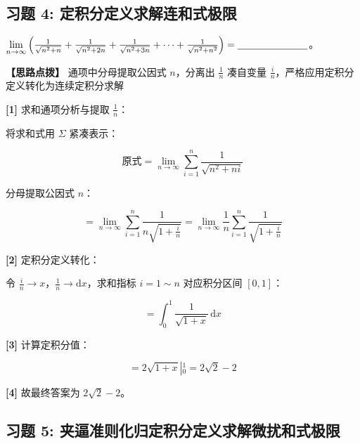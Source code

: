 \documentclass[11pt,a4paper,UTF8]{ctexart}
\begin{document}
\subsection{习题 4: 定积分定义求解连和式极限}

$\lim\limits_{n \to \infty} \left( \frac{1}{\sqrt{n^2+n}} + \frac{1}{\sqrt{n^2+2n}} + \frac{1}{\sqrt{n^2+3n}} + \dots + \frac{1}{\sqrt{n^2+n^2}} \right) = \underline{\hspace{2.5cm}}$。

\textbf{\color{DeepPurple}【思路点拨】} 通项中分母提取公因式 $n$，分离出 $\frac{1}{n}$ 凑自变量 $\frac{i}{n}$，严格应用定积分定义转化为连续定积分求解


\begin{solbox}[分步推导与答题规范]
\textbf{[1]} 求和通项分析与提取 $\frac{1}{n}$：

将求和式用 $\Sigma$ 紧凑表示：


\begin{equation*}
\text{原式} = \lim_{n \to \infty} \sum_{i=1}^n \frac{1}{\sqrt{n^2+ni}}
\end{equation*}


分母提取公因式 $n$：


\begin{equation*}
= \lim_{n \to \infty} \sum_{i=1}^n \frac{1}{n\sqrt{1 + \frac{i}{n}}} = \lim_{n \to \infty} \frac{1}{n}\sum_{i=1}^n \frac{1}{\sqrt{1 + \frac{i}{n}}}
\end{equation*}


\textbf{[2]} 定积分定义转化：

令 $\frac{i}{n} \to x$，$\frac{1}{n} \to \mathrm{d}x$，求和指标 $i=1 \sim n$ 对应积分区间 $[0, 1]$：


\begin{equation*}
= \int_0^1 \frac{1}{\sqrt{1+x}}\,\mathrm{d}x
\end{equation*}


\textbf{[3]} 计算定积分值：


\begin{equation*}
= \left. 2\sqrt{1+x} \right\vert{}_0^1 = 2\sqrt{2} - 2
\end{equation*}


\textbf{[4]} 故最终答案为 $2\sqrt{2} - 2$。
\end{solbox}


\subsection{习题 5: 夹逼准则化归定积分定义求解微扰和式极限}
\end{document}
